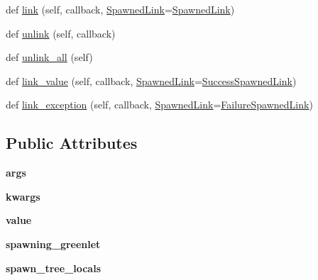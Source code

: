 \begin{DoxyCompactItemize}
\item 
def \hyperlink{classgevent_1_1greenlet_1_1_greenlet_a5b72cd674e92bcf08291428e62b53027}{link} (self, callback, \hyperlink{classgevent_1_1greenlet_1_1_spawned_link}{Spawned\+Link}=\hyperlink{classgevent_1_1greenlet_1_1_spawned_link}{Spawned\+Link})
\item 
def \hyperlink{classgevent_1_1greenlet_1_1_greenlet_a49348774b0a7f20c389c3157be70cb12}{unlink} (self, callback)
\item 
def \hyperlink{classgevent_1_1greenlet_1_1_greenlet_aac0de9949bd80dab1d419fcae124a952}{unlink\+\_\+all} (self)
\item 
def \hyperlink{classgevent_1_1greenlet_1_1_greenlet_a9ab445117d755eaca856f963f38d352d}{link\+\_\+value} (self, callback, \hyperlink{classgevent_1_1greenlet_1_1_spawned_link}{Spawned\+Link}=\hyperlink{classgevent_1_1greenlet_1_1_success_spawned_link}{Success\+Spawned\+Link})
\item 
def \hyperlink{classgevent_1_1greenlet_1_1_greenlet_abfa513d6025f881a04324fe92b6ceda0}{link\+\_\+exception} (self, callback, \hyperlink{classgevent_1_1greenlet_1_1_spawned_link}{Spawned\+Link}=\hyperlink{classgevent_1_1greenlet_1_1_failure_spawned_link}{Failure\+Spawned\+Link})
\end{DoxyCompactItemize}
\subsection*{Public Attributes}
\begin{DoxyCompactItemize}
\item 
\mbox{\label{classgevent_1_1greenlet_1_1_greenlet_abcdd299aba6f7e16841dc2a30b3dc603}} 
{\bfseries args}
\item 
\mbox{\label{classgevent_1_1greenlet_1_1_greenlet_aebe43f679ff9a4e3a6f94b3ab8662ca4}} 
{\bfseries kwargs}
\item 
\mbox{\label{classgevent_1_1greenlet_1_1_greenlet_ae6a0d66322470918eee677d2c23ca53f}} 
{\bfseries value}
\item 
\mbox{\label{classgevent_1_1greenlet_1_1_greenlet_ab3496d3e54a05e630f9c6b06968c52d3}} 
{\bfseries spawning\+\_\+greenlet}
\item 
\mbox{\label{classgevent_1_1greenlet_1_1_greenlet_a7685b5e282090ddfdb8096fa5738aa46}} 
{\bfseries spawn\+\_\+tree\+\_\+locals}
\end{DoxyCompactItemize}
